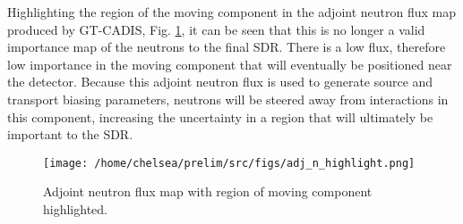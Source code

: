Highlighting the region of the moving component in the  adjoint neutron flux
map produced by GT-CADIS, Fig. \ref{fig:highlight}, it can be seen that this 
is no longer a valid importance map
of the neutrons to the final SDR. There is a low flux, therefore low
importance in the moving component that will eventually be positioned 
near the detector.  Because this adjoint neutron flux is used to generate
source and transport biasing parameters, neutrons will be steered away from 
interactions in this component, increasing the uncertainty in a region that will
ultimately be important to the SDR. 

\begin{figure} 
	\texttt{[image: /home/chelsea/prelim/src/figs/adj\_n\_highlight.png]}
	\caption[Adjoint neutron flux map with region of moving component
	highlighted.]
	{Adjoint neutron flux map with region of moving component
	highlighted. \label{fig:highlight}}
\end{figure}



